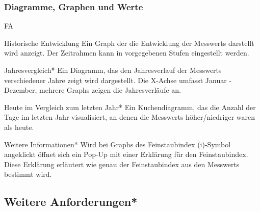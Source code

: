  \subsubsection*{Diagramme, Graphen und Werte}
 \begin{Kriterien}{FA}
  \item[Historische Entwicklung]
    Ein \gls{Graph} der die Entwicklung der \glspl{Messwert} darstellt wird anzeigt. Der Zeitrahmen kann in vorgegebenen Stufen 
    eingestellt werden.

  \item[Jahresvergleich*]
    Ein Diagramm, das den Jahresverlauf der \glspl{Messwert} verschiedener Jahre zeigt wird dargestellt.
    Die X-Achse umfasst Januar - Dezember, mehrere \glspl{Graph} zeigen die Jahresverläufe an.

  \item[Heute im Vergleich zum letzten Jahr*]
    Ein \gls{Kuchendiagramm}, das die Anzahl der Tage im letzten Jahr visualisiert, an denen die \glspl{Messwert} höher/niedriger 
    waren als heute.

  \item[Weitere Informationen*]
    Wird bei \glspl{Graph} des \gls{Feinstaubindex} (i)-Symbol angeklickt öffnet sich ein \gls{Pop-Up} mit einer Erklärung für den 
    \gls{Feinstaubindex}.
    Diese Erklärung erläutert wie genau der \gls{Feinstaubindex} aus den \glspl{Messwert} bestimmt wird.
\end{Kriterien}


\subsection{Weitere Anforderungen*}

